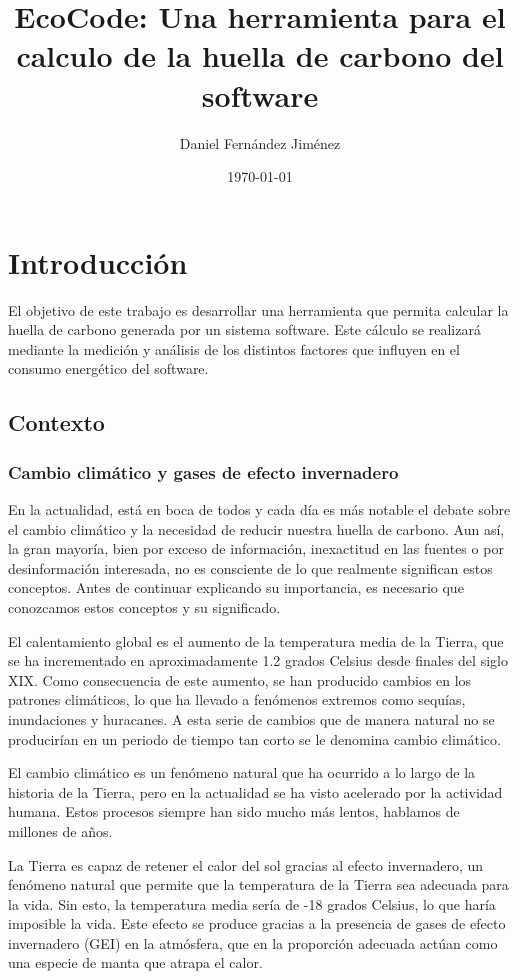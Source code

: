 \documentclass[12pt,a4paper]{report}
\title{EcoCode: Una herramienta para el calculo de la huella de carbono del software}
\author{Daniel Fernández Jiménez}
\date{\today}
\begin{document}
\maketitle

\tableofcontents
\newpage

\chapter{Introducción}

El objetivo de este trabajo es desarrollar una herramienta que permita calcular
la huella de carbono generada por un sistema software. Este cálculo se
realizará mediante la medición y análisis de los distintos factores que
influyen en el consumo energético del software.

\section{Contexto}

\subsection{Cambio climático y gases de efecto invernadero}

En la actualidad, está en boca de todos y cada día es más notable el debate
sobre el cambio climático y la necesidad de reducir nuestra huella de carbono.
Aun así, la gran mayoría, bien por exceso de información, inexactitud en las
fuentes o por desinformación interesada, no es consciente de lo que realmente
significan estos conceptos. Antes de continuar explicando su importancia, es
necesario que conozcamos estos conceptos y su significado.

El calentamiento global es el aumento de la temperatura media de la Tierra, que
se ha incrementado en aproximadamente 1.2 grados Celsius desde finales del
siglo XIX. Como consecuencia de este aumento, se han producido cambios en los
patrones climáticos, lo que ha llevado a fenómenos extremos como sequías,
inundaciones y huracanes. A esta serie de cambios que de manera natural no se
producirían en un periodo de tiempo tan corto se le denomina cambio climático.

El cambio climático es un fenómeno natural que ha ocurrido a lo largo de la
historia de la Tierra, pero en la actualidad se ha visto acelerado por la
actividad humana. Estos procesos siempre han sido mucho más lentos, hablamos de
millones de años.

La Tierra es capaz de retener el calor del sol gracias al efecto invernadero,
un fenómeno natural que permite que la temperatura de la Tierra sea adecuada
para la vida. Sin esto, la temperatura media sería de -18 grados Celsius, lo
que haría imposible la vida. Este efecto se produce gracias a la presencia de
gases de efecto invernadero (GEI) en la atmósfera, que en la proporción
adecuada actúan como una especie de manta que atrapa el calor.
\end{document}
